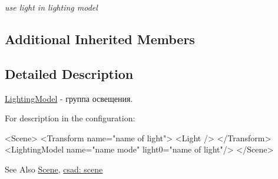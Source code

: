 \begin{DoxyCompactItemize}
\begin{DoxyCompactList}\small\item\em use light in lighting model \end{DoxyCompactList}\end{DoxyCompactItemize}
\subsection*{Additional Inherited Members}


\subsection{Detailed Description}
\hyperlink{classcsad_1_1_lighting_model}{Lighting\-Model} -\/ группа освещения. 

For description in the configuration\-: \begin{DoxyVerb}  <Scene>
     <Transform name="name of light">
        <Light />
     </Transform>
     <LightingModel name="name mode" light0="name of light"/>
  </Scene>
\end{DoxyVerb}


\begin{DoxySeeAlso}{See Also}
\hyperlink{classcsad_1_1_scene}{Scene}, \hyperlink{group__scene}{csad\-: scene} 
\end{DoxySeeAlso}
